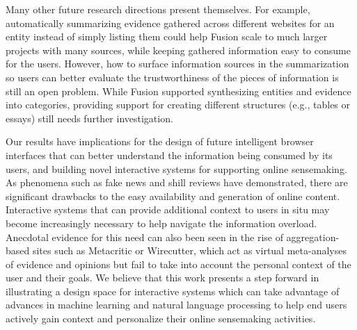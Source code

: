 Many other future research directions present themselves. For example, automatically summarizing evidence gathered across different websites for an entity instead of simply listing them could help Fusion scale to much larger projects with many sources, while keeping gathered information easy to consume for the users. However, how to surface information sources in the summarization so users can better evaluate the trustworthiness of the pieces of information is still an open problem. While Fusion supported synthesizing entities and evidence into categories, providing support for creating different structures (e.g., tables or essays) still needs further investigation.

Our results have implications for the design of future intelligent browser interfaces that can better understand the information being consumed by its users, and building novel interactive systems for supporting online sensemaking. As phenomena such as fake news and shill reviews have demonstrated, there are significant drawbacks to the easy availability and generation of online content. Interactive systems that can provide additional context to users in situ may become increasingly necessary to help navigate the information overload. Anecdotal evidence for this need can also been seen in the rise of aggregation-based sites such as Metacritic or Wirecutter, which act as virtual meta-analyses of evidence and opinions but fail to take into account the personal context of the user and their goals. We believe that this work presents a step forward in illustrating a design space for interactive systems which can take advantage of advances in machine learning and natural language processing to help end users actively gain context and personalize their online sensemaking activities.




